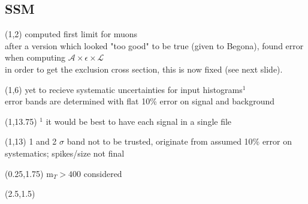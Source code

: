 
\subsection{SSM}
\begin{frame}
        \begin{textblock}{14}(1,2) %
            computed first limit for muons\\
            after a version which looked "too good" to be true (given to Begona), found error when computing $\mathcal{A}\times\epsilon\times\mathcal{L}$\\
            in order to get the exclusion cross section, this is now fixed (see next slide).
        \end{textblock}
        \begin{textblock}{14}(1,6) %
            yet to recieve systematic uncertainties for input histograms$^1$\\
            error bands are determined with flat 10\% error on signal and background\\
        \end{textblock}
        \begin{textblock}{14}(1,13.75) %
            $^1$ it would be best to have each signal in a single file
        \end{textblock}
\end{frame}
\begin{frame}
        \begin{textblock}{14}(1,13) %
            1 and 2 $\sigma$ band not to be trusted,
            originate from assumed 10\% error on systematics;
            spikes/size not final
        \end{textblock}
        \begin{textblock}{4.5}(0.25,1.75) %
            m$_T > 400$ considered
        \end{textblock}
        \begin{textblock}{11}(2.5,1.5) %
        \end{textblock}
\end{frame}
